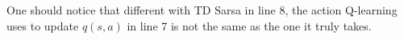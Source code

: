 \documentclass{progartcn}
\begin{document}
            One should notice that different with TD Sarsa in line 8, the action Q-learning uses to update $q(s,a)$ in line 7 is not the same as the one it truly takes.\\
\begin{comment}
            The comparison of Sarsa and Q-Learning is shown as follows:

            Sarsa: On-Policy TD control
            \begin{itemize}[noitemsep,topsep=0pt]
            	\item Choose action $A_t$ from $S_t$ using policy derived from $Q$ with $\varepsilon$-greedy;
            	\item Take action $A_t$, observe $R_{t+1}$ and $S_{t+1}$;
            	\item Choose action $A_{t+1}$ from $S_{t+1}$ using policy derived from $Q$ with $\varepsilon$-greedy;
            	\item $Q(S_t,A_t)\gets Q(S_t,A_t)+\alpha[R_{t+1}+\gamma Q(S_{t+1},A_{t+1})-Q(S_t,A_t)]$.
            \end{itemize}

            Q-Learning: Off-Policy TD control
            \begin{itemize}[noitemsep,topsep=0pt]
            	\item Choose action $A_t$ from $S_t$ using policy derived from $Q$ with $\varepsilon$-greedy;
            	\item Take action $A_t$, observe $R_{t+1}$ and $S_{t+1}$;
            	\item 'Imagine' $A_{t+1}$ as $\arg\max_{a'}Q(S_{t+1},a')$ in the update target; 
            	\item $Q(S_t,A_t)\gets Q(S_t,A_t)+\alpha[R_{t+1}+\gamma \max_{a'}Q(S_{t+1},a')-Q(S_t,A_t)]$.
            \end{itemize}
            		\subsection{Off-Policy Monte-Carlo Control: Importance Sampling}

			Off-Policy control allows us to learn from observing humans or other agents, re-use experience generated from old policies $\pi_1,\pi_2,...,\pi_t$, learn about optimal policy while following exploratory policy and learn about multiple policies while following one policy.

			\textbf{Importance Sampling for Off-Policy Monte-Carlo}: \textit{Let $G_t$ be the returns generated from $\mu$. Define the corrected return}
			\[G_t^{\pi/\mu}=\frac{\pi(A_t|S_t)\pi(A_{t+1}|S_{t+1})...\pi(A_{\tau}|S_{\tau})}{\mu(A_t|S_t)\mu(A_{t+1}|S_{t+1})...\mu(A_{\tau}|S_{\tau})}G_t,\]
			\textit{then we update value by the corrected return}
			\[V(S_t)\gets V(S_t)+\alpha(G_t^{\pi/\mu}-V(S_t)).\]


\end{comment}
\end{document}
